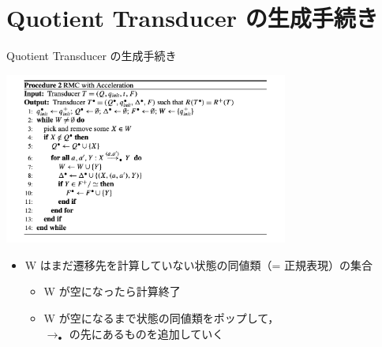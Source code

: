 \documentclass[presentation, xetex]{beamer}
\begin{document}
\section{Quotient Transducer の生成手続き}
\label{sec:org93cbff7}

\begin{frame}[label={sec:org7bbd64d}]{Quotient Transducer の生成手続き}
\begin{center}
\includegraphics[width=0.7\textwidth]{./images/quoting-rmc.png}
\end{center}

\footnotesize
\begin{itemize}
\item W はまだ遷移先を計算していない状態の同値類（= 正規表現）の集合
\begin{itemize}
\item \footnotesize
W が空になったら計算終了
\item \footnotesize
W が空になるまで状態の同値類をポップして，\\
\(\longrightarrow_\bullet\) の先にあるものを追加していく
\end{itemize}
\end{itemize}
\end{frame}
\end{document}
